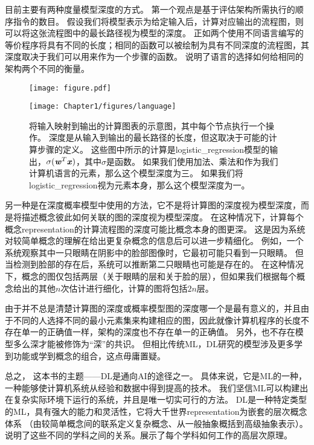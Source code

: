 
目前主要有两种度量模型深度的方式。
第一个观点是基于评估架构所需执行的顺序指令的数目。
假设我们将模型表示为给定输入后，计算对应输出的流程图，则可以将这张流程图中的最长路径视为模型的深度。
正如两个使用不同语言编写的等价程序将具有不同的长度；相同的函数可以被绘制为具有不同深度的流程图，其深度取决于我们可以用来作为一个步骤的函数。
说明了语言的选择如何给相同的架构两个不同的衡量。

\begin{figure}[!htb]
\ifOpenSource
\centerline{\texttt{[image: figure.pdf]}}
\else
\centerline{\texttt{[image: Chapter1/figures/language]}}
\fi
\caption{将输入映射到输出的计算图表的示意图，其中每个节点执行一个操作。
深度是从输入到输出的最长路径的长度，但这取决于可能的计算步骤的定义。
这些图中所示的计算是\gls{logistic_regression}模型的输出，$\sigma(\boldsymbol{\mathit{w}}^T \boldsymbol{\mathit{x}})$，其中$\sigma$是函数。
如果我们使用加法、乘法和作为我们计算机语言的元素，那么这个模型深度为三。
如果我们将\gls{logistic_regression}视为元素本身，那么这个模型深度为一。
}
\label{fig:chap1_language}
\end{figure}

另一种是在深度概率模型中使用的方法，它不是将计算图的深度视为模型深度，而是将描述概念彼此如何关联的图的深度视为模型深度。
在这种情况下，计算每个概念\gls{representation}的计算流程图的深度可能比概念本身的图更深。
这是因为系统对较简单概念的理解在给出更复杂概念的信息后可以进一步精细化。
例如，一个系统观察其中一只眼睛在阴影中的脸部图像时，它最初可能只看到一只眼睛。
但当检测到脸部的存在后，系统可以推断第二只眼睛也可能是存在的。
在这种情况下，概念的图仅包括两层（关于眼睛的层和关于脸的层），但如果我们根据每个概念给出的其他$n$次估计进行细化，计算的图将包括$2n$层。


由于并不总是清楚计算图的深度或概率模型图的深度哪一个是最有意义的，并且由于不同的人选择不同的最小元素集来构建相应的图，因此就像计算机程序的长度不存在单一的正确值一样，架构的深度也不存在单一的正确值。
另外，也不存在模型多么深才能被修饰为``深''的共识。
但相比传统\gls{ML}，\gls{DL}研究的模型涉及更多学到功能或学到概念的组合，这点毋庸置疑。

总之， 这本书的主题——\gls{DL}是通向\gls{AI}的途径之一。
具体来说，它是\gls{ML}的一种，一种能够使计算机系统从经验和数据中得到提高的技术。
我们坚信\gls{ML}可以构建出在复杂实际环境下运行的系统，并且是唯一切实可行的方法。
\gls{DL}是一种特定类型的\gls{ML}，具有强大的能力和灵活性，它将大千世界\gls{representation}为嵌套的层次概念体系
（由较简单概念间的联系定义复杂概念、从一般抽象概括到高级抽象表示）。
说明了这些不同的学科之间的关系。展示了每个学科如何工作的高层次原理。

